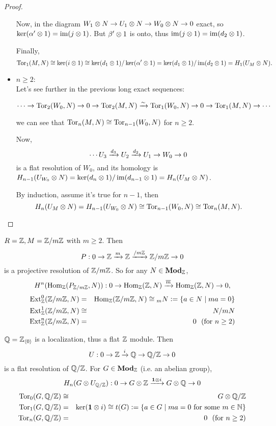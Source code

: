 \begin{theorem}
\begin{proof}
\begin{itemize}
    Now, in the diagram $W_1 \otimes N \to U_1 \otimes N \to W_0 \otimes N \to 0$ exact, so 
    $\ker (\alpha' \otimes 1) = \operatorname{im} (j \otimes 1)$. But $\beta' \otimes 1$ is onto, thus 
    $\operatorname{im} (j \otimes 1) = \operatorname{im} (d_2 \otimes 1)$. 

    Finally, 
    $$\operatorname{Tor}_1(M, N) \cong \ker(i \otimes 1) \cong \ker (d_1 \otimes 1) / \ker(\alpha' \otimes 1)
    = \ker (d_1 \otimes 1) / \operatorname{im}(d_2 \otimes 1) = H_1(U_M \otimes N).$$

    \item $n \ge 2$: \\
      Let's see further in the previous long exact sequences:

      $$\cdots \to \operatorname{Tor}_2(W_0, N) \to 0 \to \operatorname{Tor}_2(M, N)
      \xrightarrow{\sim} \operatorname{Tor}_1(W_0, N) \to 0 \to \operatorname{Tor}_1(M, N) \to \cdots
      $$

      we can see that $\operatorname{Tor}_n(M, N) \cong \operatorname{Tor}_{n-1}(W_0, N)$ for $n \ge 2$.

      Now, 
      $$\cdots U_3 \xrightarrow{d_3} U_2 \xrightarrow{d_2} U_1 \to W_0 \to 0$$
      is a flat resolution of $W_0$, and its homology is 
      $H_{n-1}(U_{W_0} \otimes N) = \ker(d_n \otimes 1) / \operatorname{im}(d_{n-1} \otimes 1) = H_n(U_M \otimes N)$.

      By induction, assume it's true for $n-1$, then
      $$H_n(U_M \otimes N) = H_{n-1}(U_{W_0} \otimes N) \cong \operatorname{Tor}_{n-1}(W_0, N) \cong \operatorname{Tor}_n(M, N).$$
    \end{itemize}
  \end{proof}
\end{theorem}

\begin{example}
  $R = \mathbb{Z}, M = \mathbb{Z}/m\mathbb{Z}$ with $m \ge 2$. Then
  $$P : 0 \to \mathbb{Z} \xrightarrow{m} \mathbb{Z} \xrightarrow{/m\mathbb{Z}} \mathbb{Z}/m\mathbb{Z} \to 0$$
  is a projective resolution of $\mathbb{Z}/m\mathbb{Z}$. So for any $N \in \mathbf{Mod}_{\mathbb{Z}}$,
  $$H^n(\operatorname{Hom}_{\mathbb{Z}}(P_{\mathbb{Z}/m\mathbb{Z}}, N)) : 0 \to \operatorname{Hom}_{\mathbb{Z}}(\mathbb{Z}, N) \xrightarrow{\overline{m}} \operatorname{Hom}_{\mathbb{Z}}(\mathbb{Z}, N) \to 0,$$
  \begin{eqnarray*}
    \operatorname{Ext}_{\mathbb{Z}}^0(\mathbb{Z}/m\mathbb{Z}, N) &=& \operatorname{Hom}_{\mathbb{Z}}(\mathbb{Z}/m\mathbb{Z}, N) \cong {}_m N \vcentcolon= \{a \in N \mid ma = 0\}\\
    \operatorname{Ext}_{\mathbb{Z}}^1(\mathbb{Z}/m\mathbb{Z}, N) &\cong& N / mN \\
    \operatorname{Ext}_{\mathbb{Z}}^n(\mathbb{Z}/m\mathbb{Z}, N) &=& 0\ \ (\textrm{for } n \ge 2)
  \end{eqnarray*}
\end{example}

\begin{example}
  $\mathbb{Q} = \mathbb{Z}_{\langle 0 \rangle}$ is a localization, thus a flat $\mathbb{Z}$ module.
  Then
  $$U : 0 \to \mathbb{Z} \xrightarrow{i} \mathbb{Q} \to \mathbb{Q}/\mathbb{Z} \to 0$$
  is a flat resolution of $\mathbb{Q}/\mathbb{Z}$. For $G \in \mathbf{Mod}_{\mathbb{Z}}$ (i.e. an abelian group),
  $$H_n(G \otimes U_{\mathbb{Q}/\mathbb{Z}}) : 0 \to G \otimes \mathbb{Z} \xrightarrow{\mathbf{1} \otimes i} G \otimes \mathbb{Q} \to 0$$
  \begin{eqnarray*}
    \operatorname{Tor}_0(G, \mathbb{Q}/\mathbb{Z}) &\cong& G \otimes \mathbb{Q}/\mathbb{Z} \\
    \operatorname{Tor}_1(G, \mathbb{Q}/\mathbb{Z}) &=& \ker(\mathbf{1} \otimes i) \cong t(G) \vcentcolon=
    \lbrace a \in G \mid ma = 0 \textrm{ for some } m \in \mathbb{N}\rbrace \\
    \operatorname{Tor}_n(G, \mathbb{Q}/\mathbb{Z}) &=& 0\ \ (\textrm{for } n \ge 2)
  \end{eqnarray*}
\end{example}

